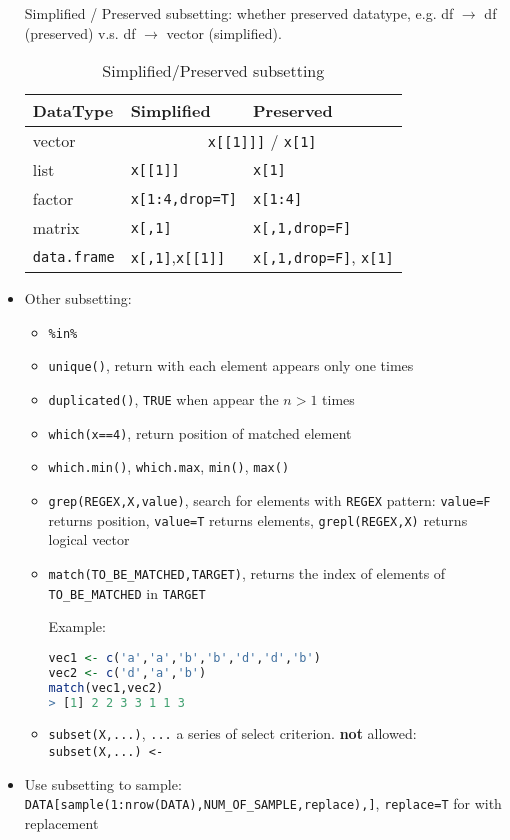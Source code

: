 \begin{itemize}[topsep=2pt,itemsep=0pt]
    Simplified / Preserved subsetting: whether preserved datatype, e.g. df $ \to $ df (preserved) v.s. df $ \to $ vector (simplified).
\begin{table}[H]
    \centering
    \renewcommand\arraystretch{1.15}
    \begin{tabular}{lll}
        \hline
        DataType&Simplified&Preserved\\
        \hline
        vector&\multicolumn{2}{c}{\lstinline|x[[1]]]| / \lstinline|x[1]|}\\
        list&\lstinline|x[[1]]|&\lstinline|x[1]|\\
        factor&\lstinline|x[1:4,drop=T]|&\lstinline|x[1:4]|\\
        matrix&\lstinline|x[,1]|&\lstinline|x[,1,drop=F]|\\
        \lstinline|data.frame|&\lstinline|x[,1]|,\lstinline|x[[1]]|&\lstinline|x[,1,drop=F]|, \lstinline|x[1]|\\
        \hline
    \end{tabular}
    \caption{Simplified/Preserved subsetting}
\end{table}
    \item Other subsetting:
    \begin{itemize}[topsep=2pt,itemsep=0pt]
        \item \lstinline|%in%| 
        \item \lstinline|unique()|, return with each element appears only one times
        \item \lstinline|duplicated()|, \lstinline|TRUE| when appear the $ n>1 $ times
        \item \lstinline|which(x==4)|, return position of matched element
        \item \lstinline|which.min()|, \lstinline|which.max|, \lstinline|min()|, \lstinline|max()|
        \item \lstinline|grep(REGEX,X,value)|, search for elements with \lstinline|REGEX| pattern: \lstinline|value=F| returns position, \lstinline|value=T| returns elements, \lstinline|grepl(REGEX,X)| returns logical vector
        \item \lstinline|match(TO_BE_MATCHED,TARGET)|, returns the index of elements of \lstinline|TO_BE_MATCHED| in \lstinline|TARGET|
        
        \begin{rcode}
            Example:
\begin{lstlisting}[language=R]
vec1 <- c('a','a','b','b','d','d','b')
vec2 <- c('d','a','b')
match(vec1,vec2)
> [1] 2 2 3 3 1 1 3
\end{lstlisting}
        \end{rcode}
        \item \lstinline|subset(X,...)|, \lstinline|...| a series of select criterion. \textbf{not} allowed: \lstinline|subset(X,...) <- | 
    \end{itemize}
    \item Use subsetting to sample: \lstinline|DATA[sample(1:nrow(DATA),NUM_OF_SAMPLE,replace),]|, \lstinline|replace=T| for with replacement
\end{itemize}

